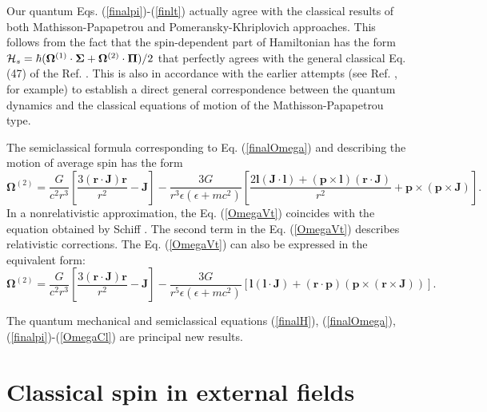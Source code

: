 \documentclass[preprint,showpacs,preprintnumbers,amsmath,amssymb]{revtex4}
\begin{document}
Our quantum Eqs. (\ref{finalpi})-(\ref{finlt}) actually agree with the
classical results of both Mathisson-Papapetrou and Pomeransky-Khriplovich
approaches. This follows from the fact that the spin-dependent
part of Hamiltonian has the form ${\cal H}_s=\hbar(\bm\Omega^{(1)}
\cdot\bm \Sigma+\bm\Omega^{(2)}\cdot\bm\Pi)/2$ that perfectly agrees
with the general classical Eq. (47) of the Ref. \cite{PK}.
This is also in accordance with the earlier attempts (see Ref.
\cite{wong}, for example) to establish a direct general
correspondence between the quantum dynamics and the classical
equations of motion of the Mathisson-Papapetrou type.

The semiclassical formula corresponding to Eq. (\ref{finalOmega})
and describing the motion of average spin has the form
\begin{equation}\label{OmegaVt}
\bm\Omega^{(2)}= \frac{G}{c^2r^3} \left[\frac{3(\bm r\cdot\bm J)\bm r}
{r^2} - \bm J\right] - \frac{3G}{r^3\epsilon(\epsilon+mc^2)}\left[
\frac{2\bm l (\bm J\cdot\bm l)+(\bm p\times\bm l) (\bm r\cdot\bm J)}
{r^2}+\bm p\times(\bm p \times\bm J)\right].
\end{equation}
In a nonrelativistic approximation, the Eq. (\ref{OmegaVt}) coincides
with the equation obtained by Schiff \cite{Schiff}. The second
term in the Eq. (\ref{OmegaVt}) describes relativistic corrections.
The Eq. (\ref{OmegaVt}) can also be expressed in the equivalent form:
\begin{equation}\label{OmegaCl}
\bm\Omega^{(2)}=\frac{G}{c^2r^3}\left[\frac{3(\bm r\cdot\bm J)\bm
r}{r^2} - \bm J\right] -
\frac{3G}{r^5\epsilon(\epsilon+mc^2)}\left[\bm l (\bm l \cdot\bm
J)+(\bm r\cdot\bm p) (\bm p\times(\bm r\times\bm J))\right].
\end{equation}

The quantum mechanical and semiclassical equations (\ref{finalH}),
(\ref{finalOmega}), (\ref{finalpi})-(\ref{OmegaCl})
are principal new results.

\section{Classical spin in external fields}\label{CS}
\end{document}
